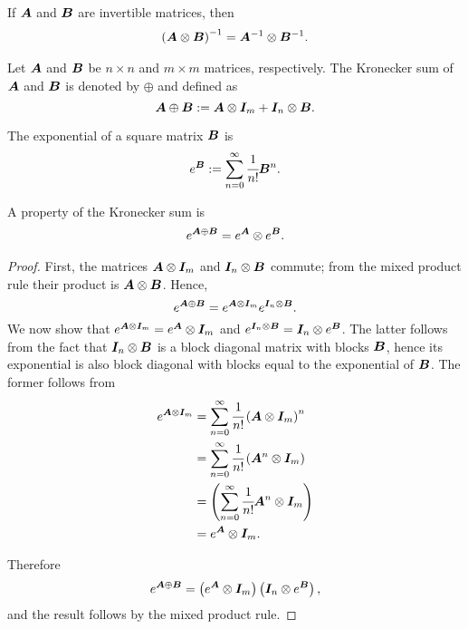 If \(\boldsymbol A\) and \(\boldsymbol{B}\) are invertible matrices, then 
\begin{align}\label{eqn:kron inverse}
	\left(\boldsymbol A\otimes \boldsymbol{B}\right)^{-1} = \boldsymbol A^{-1}\otimes \boldsymbol{B}^{-1}.
\end{align}

Let \(\boldsymbol A\) and \(\boldsymbol{B}\) be \(n\times n\) and \(m\times m\) matrices, respectively. The Kronecker sum of \(\boldsymbol A\) and \(\boldsymbol{B}\) is denoted by \(\oplus\) and defined as 
\[\boldsymbol A\oplus \boldsymbol{B} := \boldsymbol A\otimes \boldsymbol{I}_{m} + \boldsymbol{I}_{n}\otimes \boldsymbol{B}.\]

The exponential of a square matrix \(\boldsymbol B\) is \[e^{\boldsymbol B} := \sum_{n=0}^\infty \cfrac{1}{n!}\boldsymbol B^n.\]

A property of the Kronecker sum is 
\begin{align}\label{eqn:kron exp}
	e^{\boldsymbol A\oplus \boldsymbol{B}}= e^{\boldsymbol A}\otimes e^{\boldsymbol{B}}.
\end{align}
\begin{proof}
	First, the matrices \(\boldsymbol A\otimes \boldsymbol{I}_m\) and \(\boldsymbol{I}_n\otimes \boldsymbol{B}\) commute; from the mixed product rule their product is \(\boldsymbol A\otimes \boldsymbol{B}\). Hence, 
	\[e^{\boldsymbol A\oplus \boldsymbol{B}} = e^{\boldsymbol A\otimes \boldsymbol{I}_m}e^{\boldsymbol{I}_n\otimes \boldsymbol{B}}.\]
	We now show that \(e^{\boldsymbol A\otimes \boldsymbol{I}_m} = e^{\boldsymbol A}\otimes \boldsymbol{I}_m\) and \(e^{\boldsymbol{I}_n\otimes \boldsymbol{B}}=\boldsymbol{I}_n\otimes e^{\boldsymbol{B}}\). The latter follows from the fact that \(\boldsymbol{I}_n\otimes \boldsymbol{B}\) is a block diagonal matrix with blocks \(\boldsymbol{B}\), hence its exponential is also block diagonal with blocks equal to the exponential of \(\boldsymbol{B}\). The former follows from 
	\begin{align}
	e^{\boldsymbol A\otimes \boldsymbol{I}_m} &= \sum_{n=0}^\infty \cfrac{1}{n!}\left(\boldsymbol A\otimes \boldsymbol{I}_m\right)^n \nonumber
	\\&= \sum_{n=0}^\infty \cfrac{1}{n!}\left(\boldsymbol A^n\otimes \boldsymbol{I}_m\right) \nonumber
	\\&=\left(\sum_{n=0}^\infty \cfrac{1}{n!}\boldsymbol A^n\otimes \boldsymbol{I}_m\right) \nonumber
	\\&=e^{\boldsymbol A}\otimes \boldsymbol{I}_m.\label{eqn:09ksdjgah}
	\end{align}
	
	Therefore 
	\[e^{\boldsymbol A\oplus \boldsymbol{B}} = \left(e^{\boldsymbol A}\otimes \boldsymbol{I}_m\right)\left(\boldsymbol{I}_n\otimes e^{\boldsymbol{B}}\right),\]
	and the result follows by the mixed product rule. 
\end{proof}

